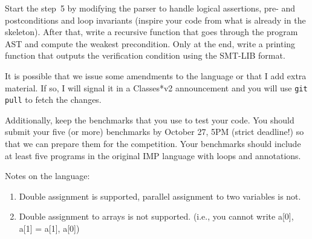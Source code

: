 \documentclass[11pt]{article}
\begin{document}
Start the step~5 by modifying the parser to handle logical assertions,
pre- and postconditions and loop invariants (inspire your code from what
is already in the skeleton).  After that, write a recursive function that
goes through the program AST and compute the weakest precondition.  Only
at the end, write a printing function that outputs the verification condition
using the SMT-LIB format.

It is possible that we issue some amendments to the language or that I
add extra material.  If so, I will signal it in a Classes*v2 announcement
and you will use \texttt{git pull} to fetch the changes.

Additionally, keep the benchmarks that you use to test your code. 
You should submit your five (or more) benchmarks by October 27, 5PM (strict
deadline!) so that we can prepare them for the competition.  Your benchmarks
should include at least five programs in the original IMP language with loops and annotations.



Notes on the language: 
\begin{enumerate}
\item Double assignment is supported, parallel assignment to two variables is not.
\item Double assignment to arrays is not supported. (i.e., you cannot write a[0], a[1] = a[1], a[0])
\end{enumerate}

\end{document}
